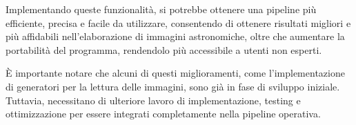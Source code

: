 Implementando queste funzionalità, si potrebbe ottenere una pipeline più efficiente, precisa e facile da utilizzare, consentendo di ottenere risultati migliori e più affidabili nell'elaborazione di immagini astronomiche, oltre che aumentare la portabilità del programma, rendendolo più accessibile a utenti non esperti.

È importante notare che alcuni di questi miglioramenti, come l'implementazione di generatori per la lettura delle immagini, sono già in fase di sviluppo iniziale. Tuttavia, necessitano di ulteriore lavoro di implementazione, testing e ottimizzazione per essere integrati completamente nella pipeline operativa.

\cleardoublepage